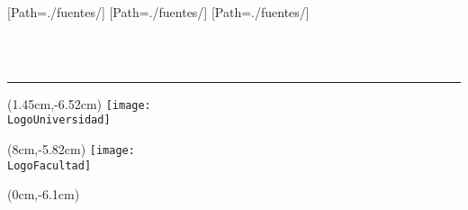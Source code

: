 
\newfontfamily{}[Path=./fuentes/] 
\newfontfamily{}[Path=./fuentes/] 
\newfontfamily{}[Path=./fuentes/] 

\begin{titlepage}


\thispagestyle{empty}

\noindent\begin{minipage}{\textwidth}
\centering
 {\ArialMT\fontsize{20pt}{25pt}
 {
 {\MakeUppercase\Universidad}}}\\[0.5cm]
 {\ArialBoldMT\fontsize{14pt}{17pt}
 {}}\\[0.42cm] 
 {\ArialBoldMT\fontsize{13pt}{16pt}
 {}}
\noindent\rule[-0.22cm]{\textwidth}{5pt} %
\end{minipage}

\vfill

\begin{textblock*}{4cm}(1.45cm,-6.52cm)%
	 \texttt{[image: \\LogoUniversidad]}
\end{textblock*}
\begin{textblock*}{10cm}(8cm,-5.82cm)%
	 \texttt{[image: \\LogoFacultad]}
\end{textblock*}

\vfill

\begin{textblock*}{\textwidth}(0cm,-6.1cm)%
\noindent
\begin{minipage}{\textwidth}
\begin{spacing}{2.1}
 \centering
  {\fontsize{25pt}{30pt}\ArialBoldMT
  {\addfontfeature{}
 \titulo}}
\end{spacing}
\end{minipage}
\end{textblock*}


\end{titlepage}
